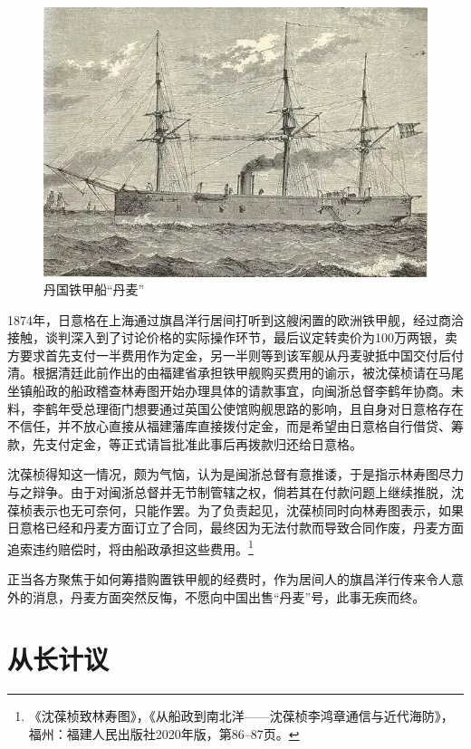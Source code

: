 \documentclass[12pt,UTF8]{ctexbook}
\begin{document}
\begin{figure}[htbp]
	\centering
	\includegraphics[width=1\linewidth]{Images/46}
	\caption{丹国铁甲船“丹麦”}
	\label{fig:1}
\end{figure}

1874年，日意格在上海通过旗昌洋行居间打听到这艘闲置的欧洲铁甲舰，经过商洽接触，谈判深入到了讨论价格的实际操作环节，最后议定转卖价为100万两银，卖方要求首先支付一半费用作为定金，另一半则等到该军舰从丹麦驶抵中国交付后付清。根据清廷此前作出的由福建省承担铁甲舰购买费用的谕示，被沈葆桢请在马尾坐镇船政的船政稽查林寿图开始办理具体的请款事宜，向闽浙总督李鹤年协商。未料，李鹤年受总理衙门想要通过英国公使馆购舰思路的影响，且自身对日意格存在不信任，并不放心直接从福建藩库直接拨付定金，而是希望由日意格自行借贷、筹款，先支付定金，等正式请旨批准此事后再拨款归还给日意格。

沈葆桢得知这一情况，颇为气恼，认为是闽浙总督有意推诿，于是指示林寿图尽力与之辩争。由于对闽浙总督并无节制管辖之权，倘若其在付款问题上继续推脱，沈葆桢表示也无可奈何，只能作罢。为了负责起见，沈葆桢同时向林寿图表示，如果日意格已经和丹麦方面订立了合同，最终因为无法付款而导致合同作废，丹麦方面追索违约赔偿时，将由船政承担这些费用。\footnote{《沈葆桢致林寿图》，《从船政到南北洋——沈葆桢李鸿章通信与近代海防》，福州：福建人民出版社2020年版，第86--87页。}

正当各方聚焦于如何筹措购置铁甲舰的经费时，作为居间人的旗昌洋行传来令人意外的消息，丹麦方面突然反悔，不愿向中国出售“丹麦”号，此事无疾而终。

\section{从长计议}
\end{document}
